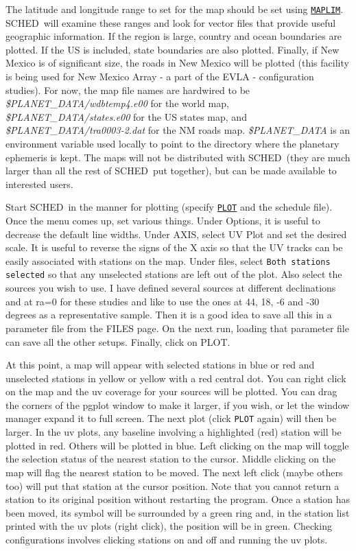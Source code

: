 \documentclass{report}
\newcommand{\schedb}{{\sc SCHED~}}
\begin{document}
The latitude and longitude range to set for the map should be set
using 
{\hyperref[MP:MAPLIM]{{\tt MAPLIM}}}.  \schedb will examine these
ranges and look for vector files that provide useful geographic
information.  If the region is large, country and ocean boundaries are
plotted.  If the US is included, state boundaries are also plotted.
Finally, if New Mexico is of significant size, the roads in New Mexico
will be plotted (this facility is being used for New Mexico Array - a
part of the EVLA - configuration studies).  For now, the map file
names are hardwired to be {\sl \$PLANET\_DATA/wdbtemp4.e00} for the
world map, {\sl \$PLANET\_DATA/states.e00} for the US states map, and
{\sl \$PLANET\_DATA/tra0003-2.dat} for the NM roads map.  {\sl
\$PLANET\_DATA} is an environment variable used locally to point to the
directory where the planetary ephemeris is kept.  The maps will not
be distributed with \schedb (they are much larger than all the rest
of \schedb put together), but can be made available to interested
users.

Start \schedb in the manner for plotting (specify 
{\hyperref[MP:PLOT]{{\tt PLOT}}} and the schedule file).
Once the menu comes up, set various
things.  Under Options, it is useful to decrease the default line
widths.  Under AXIS, select UV Plot and set the desired scale.  It
is useful to reverse the signs of the X axis so that the UV tracks
can be easily associated with stations on the map.  Under files,
select {\tt Both stations selected} so that any unselected stations
are left out of the plot.  Also select the sources you wish to use.
I have defined several sources at different declinations and at ra=0
for these studies and like to use the ones at 44, 18, -6 and -30 degrees
as a representative sample.  Then it is a good idea to save all this in
a parameter file from the FILES page.  On the next run, loading that
parameter file can save all the other setups.  Finally, click on PLOT.

At this point, a map will appear with selected stations in blue or red
and unselected stations in yellow or yellow with a red central dot.
You can right click on the map and the uv coverage for your sources
will be plotted.  You can drag the corners of the pgplot window to
make it larger, if you wish, or let the window manager expand it to
full screen.  The next plot (click {\tt PLOT} again) will then be
larger.  In the uv plots, any baseline involving a highlighted (red)
station will be plotted in red.  Others will be plotted in blue.  Left
clicking on the map will toggle the selection status of the nearest
station to the cursor.  Middle clicking on the map will flag the
nearest station to be moved.  The next left click (maybe others too)
will put that station at the cursor position.  Note that you cannot
return a station to its original position without restarting the
program.  Once a station has been moved, its symbol will be surrounded
by a green ring and, in the station list printed with the uv plots
(right click), the position will be in green.  Checking configurations
involves clicking stations on and off and running the uv plots.
\end{document}
